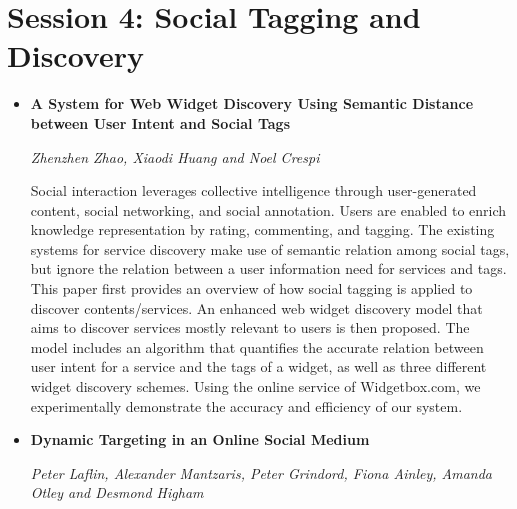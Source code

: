 \section{Session 4: Social Tagging and Discovery}
\begin{itemize}

\item \textbf{A System for Web Widget Discovery Using Semantic Distance between
User Intent and Social Tags}

\textit{Zhenzhen Zhao, Xiaodi Huang and Noel Crespi}

Social interaction leverages collective intelligence through user-generated
content, social networking, and social annotation. Users are enabled to enrich
knowledge representation by rating, commenting, and tagging. The existing
systems for service discovery make use of semantic relation among social tags,
but ignore the relation between a user information need for services and tags.
This paper first provides an overview of how social tagging is applied to
discover contents/services. An enhanced web widget discovery model that aims to
discover services mostly relevant to users is then proposed. The model includes
an algorithm that quantifies the accurate relation between user intent for a
service and the tags of a widget, as well as three different widget discovery
schemes. Using the online service of Widgetbox.com, we experimentally
demonstrate the accuracy and efficiency of our system.


\item \textbf{Dynamic Targeting in an Online Social Medium}

\textit{Peter Laflin, Alexander Mantzaris, Peter Grindord, Fiona Ainley, Amanda
Otley and Desmond Higham}


\end{itemize}
